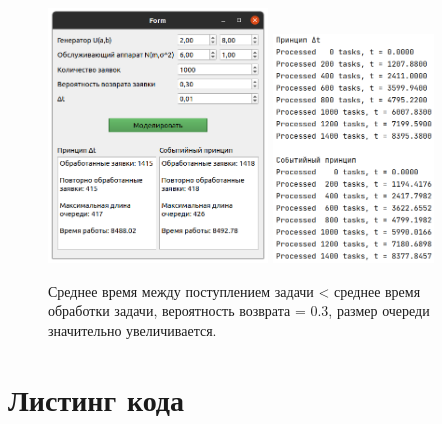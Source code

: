 \begin{figure}[h!]
\centering
\includegraphics[width=0.52\textwidth]{4/ex_2}
\includegraphics[width=0.38\textwidth]{4/ex_2_log}
\caption{Среднее время между поступлением задачи < среднее время обработки задачи, вероятность возврата = 0.3, размер очереди значительно увеличивается.}
\end{figure}


\pagebreak
\section{Листинг кода}



